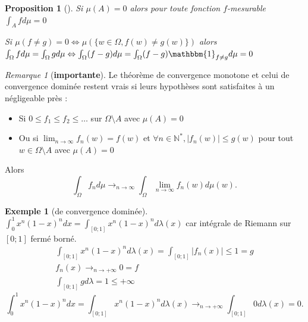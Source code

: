 \documentclass{article}
\theoremstyle{plain}%
\newtheorem{prop}[thm]{Proposition}
\theoremstyle{definition}
\newtheorem{exmp}{Exemple}[section]
\theoremstyle{remark}
\newtheorem*{rem}{Remarque}
\begin{document}
    \begin{prop}[]
        Si $ \mu (A) = 0 $  alors pour toute fonction $ f $-mesurable $ \int_{A}^{}fd \mu = 0$  

        Si $ \mu (f \neq g) = 0 \Leftrightarrow \mu (\{w \in \Omega , f(w) \neq g(w)\})$ alors $ \int_{\Omega }^{}fd \mu = \int_{\Omega }^{} gd \mu \Leftrightarrow \int_{\Omega }^{}(f-g) d \mu = \int_{\Omega }^{} (f-g) \mathbbm{1}_{f \neq g} d \mu  = 0$ 
    \end{prop}
    \begin{rem}[\textbf{importante}]
        Le théorème de convergence monotone et celui de convergence dominée restent vrais si leurs hypothèses sont satisfaites à un négligeable près : 
        \begin{itemize}
            \item Si $ 0 \leq f_1 \leq f_2 \leq \dots $ sur $ \Omega \setminus A $  avec $ \mu (A) = 0 $ 
            \item Ou si $\lim_{n \to \infty} f_n(w) = f(w)$ et $ \forall n \in \mathbb{N}^*, \left| f_n(w) \right| \leq g(w) $ pour tout $ w \in \Omega \setminus A $ avec $ \mu (A) = 0 $ 
        \end{itemize}
        Alors 
        \[
            \int_{\Omega }^{}f_n d \mu \to_{n \to \infty} \int_{\Omega }^{}\lim_{n \to \infty} f_n(w) d \mu (w)
        .\]
    \end{rem}
    \begin{exmp}[de convergence dominée]
        $\int_{0}^{1} x^n (1-x)^n dx = \int_{[0;1]}^{}x^n(1-x)^n d \lambda (x)$ car intégrale de Riemann sur $ [0;1] $ fermé borné. \begin{align*}
            \int_{[0;1]}^{}x^n(1-x)^n d \lambda (x) = \int_{[0;1]}^{}\left| f_n (x) \right| \leq 1=g \\
            f_n(x) \to_{n \to +\infty } 0 = f \\
            \int_{[0;1]}^{}gd \lambda =1 \leq + \infty 
        \end{align*}
        \[
            \int_{0}^{1} x^n (1-x)^n dx = \int_{[0;1]}^{}x^n(1-x)^n d \lambda (x) \to_{n \to +\infty } \int_{[0;1]}^{}0 d \lambda (x) = 0
        .\]
    \end{exmp}
    
\end{document}
